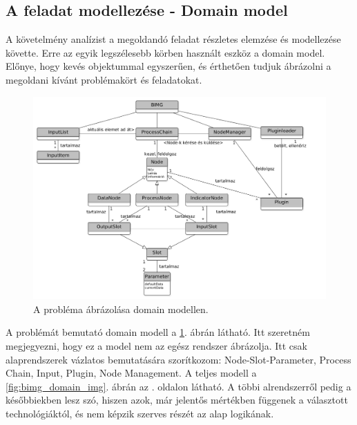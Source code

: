 \documentclass[a4paper,12pt,oneside]{report}
\begin{document}
\subsection{A feladat modellezése - Domain model}
A követelmény analízist a megoldandó feladat részletes elemzése és modellezése követte. Erre az egyik legszélesebb körben használt eszköz a domain model. Előnye, hogy kevés objektummal egyszerűen, és érthetően tudjuk ábrázolni a megoldani kívánt problémakört és feladatokat.\cite{book:usecase_book_brief}
\begin{center}
\begin{figure}[h]
  \includegraphics[width=1.2\textwidth]{domain_real_gray.png}
  \caption{A probléma ábrázolása domain modellen. }

  \label{fig:bimg_domain_realworld_img}
\end{figure}
\end{center}
A problémát bemutató domain modell a \ref{fig:bimg_domain_realworld_img}. ábrán látható. Itt szeretném megjegyezni, hogy ez a model nem az egész rendszer ábrázolja. Itt csak alaprendszerek vázlatos bemutatására szorítkozom: Node-Slot-Parameter, Process Chain, Input, Plugin, Node Management. A teljes modell a \ref{fig:bimg_domain_img}. ábrán az \pageref{fig:bimg_domain_img}. oldalon látható. A többi alrendszerről pedig a későbbiekben lesz szó, hiszen azok, már jelentős mértékben függenek a választott technológiáktól, és nem képzik szerves részét az alap logikának.
\end{document}
